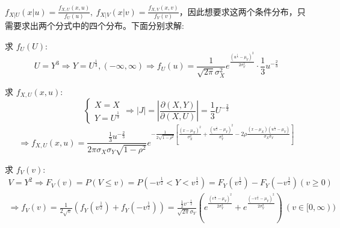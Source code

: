 $f_{X|U}(x|u)=\frac{f_{X,U}(x,u)}{f_U(u)},\ f_{X|V}(x|v)=\frac{f_{X, V}(x, v)}{f_V(v)}$，因此想要求这两个条件分布，只需要求出两个分式中的四个分布。下面分别求解:

求 $f_U(U)$:
\begin{equation}\tag*{}
U=Y^3\Rightarrow Y=U^{\frac{1}{3}}, (-\infty, \infty)\Rightarrow f_U(u)=\frac{1}{\sqrt{2\pi}\sigma_X^2}e^{\frac{(u^{\frac{1}{3}}-\mu_Y)^2}{2\sigma_Y^2}}\cdot\frac{1}{3}u^{-\frac{2}{3}}
\end{equation}

求 $f_{X,U}(x,u)$:
\begin{equation}\tag*{}
\begin{cases}X=X\\Y=U^{\frac{1}{3}}\end{cases}\Rightarrow
|J|=\left|\frac{\partial(X, Y)}{\partial(X, U)}\right|=\frac{1}{3}U^{-\frac{2}{3}}\end{equation}
\begin{equation}\tag*{}
\Rightarrow f_{X, U}(x, u)=\frac{\frac{1}{3}u^{-\frac{2}{3}}}{2\pi\sigma_X\sigma_Y\sqrt{1-\rho^2}}e^{-\frac{1}{2\sqrt{1-\rho^2}}\left[\frac{(x-\mu_X)^2}{\sigma_X^2}+\frac{(u^{\frac{1}{3}}-\mu_Y)^2}{\sigma_Y^2}-2\rho\frac{(x-\mu_X)(u^{\frac{1}{3}}-\mu_Y)}{\sigma_X\sigma_Y}\right]}
\end{equation}

求 $f_V(v)$:
\begin{equation}\tag*{}
\begin{split}
V=Y^2\Rightarrow F_V(v)=P(V\leq v)=P(-v^{\frac{1}{2}}<Y<v^\frac{1}{2})=F_Y(v^\frac{1}{2})-F_Y(-v^\frac{1}{2}) (v\ge 0)
\end{split}
\end{equation}
\begin{equation}\tag*{}
\begin{split}
\Rightarrow f_V(v)=\frac{1}{2\sqrt{v}}(f_Y(v^\frac{1}{2})+f_Y(-v^\frac{1}{2}))=\frac{\frac{1}{2}v^{-\frac{1}{2}}}{\sqrt{2\pi}\sigma_Y}\left(e^{\frac{(v^\frac{1}{2}-\mu_Y)^2}{2\sigma_Y^2}}+e^{\frac{(-v^\frac{1}{2}-\mu_Y)^2}{2\sigma_Y^2}}\right)\ (v\in[0, \infty))
\end{split}
\end{equation}


